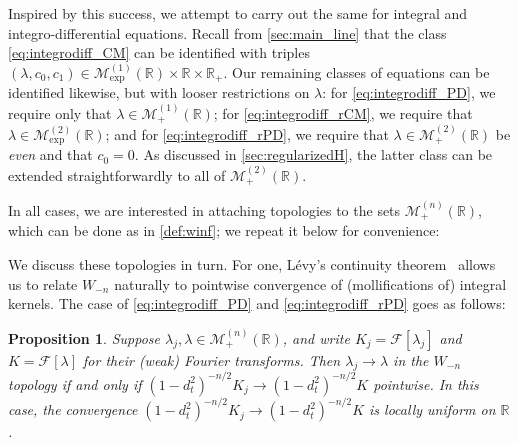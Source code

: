 \documentclass{cams-l} %
\newcommand{\dave}[1]{#1}\newcommand{\davebegin}{}\newcommand{\daveend}{}\newcommand{\george}[1]{#1}
\newcommand{\RR}{\mathbb R}
\newcommand{\cM}{\mathcal M}
\newcommand{\cF}{\mathcal F}
\newtheorem{proposition}[theorem]{Proposition}
\theoremstyle{definition}
\theoremstyle{remark}
\numberwithin{equation}{section}
\begin{document}
Inspired by this success, we attempt to carry out the same for integral and integro-differential equations. Recall from \cref{sec:main_line} that the class \ref{eq:integrodiff_CM} can be identified with triples $(\lambda,c_0,c_1)\in\cM_\mathrm{exp}^{(1)}(\RR)\times\RR\times\RR_+$. Our remaining classes of equations can be identified likewise, but with looser restrictions on $\lambda$: for \ref{eq:integrodiff_PD}, we require only that $\lambda\in\cM_+^{(1)}(\RR)$; for \ref{eq:integrodiff_rCM}, we require that $\lambda\in\cM_\mathrm{exp}^{(2)}(\RR)$; and for \ref{eq:integrodiff_rPD}, we require that $\lambda\in\cM_+^{(2)}(\RR)$ be \emph{even} and that $c_0=0$. As discussed in \cref{sec:regularizedH}, the latter class can be extended straightforwardly to \dave{all} of $\cM_+^{(2)}(\RR)$.

In all cases, we are interested in attaching topologies to the sets $\cM_+^{(n)}(\RR)$, which can be done as in \cref{def:winf}; \dave{we repeat it below for convenience:}

We discuss these topologies in turn. For one, L\'evy's continuity theorem~\cite[Thm.~26.3]{billingsley2017probability} allows us to relate $W_{-n}$ naturally to pointwise convergence of (mollifications of) integral kernels. The case of \ref{eq:integrodiff_PD} and \ref{eq:integrodiff_rPD} goes as follows:
\begin{proposition}\label{prop:time_cont_PD}
    Suppose $\lambda_j,\lambda\in\cM_+^{(n)}(\RR)$, and write $K_j=\cF[\lambda_j]$ and $K=\cF[\lambda]$ for their (weak) Fourier transforms. Then $\lambda_j\to\lambda$ in the $W_{-n}$ topology if and only if $(1-d_t^2)^{-n/2}K_j\to (1-d_t^2)^{-n/2}K$ pointwise. In this case, the convergence $(1-d_t^2)^{-n/2}K_j\to (1-d_t^2)^{-n/2}K$ is locally uniform on $\RR$.
\end{proposition}
\end{document}
